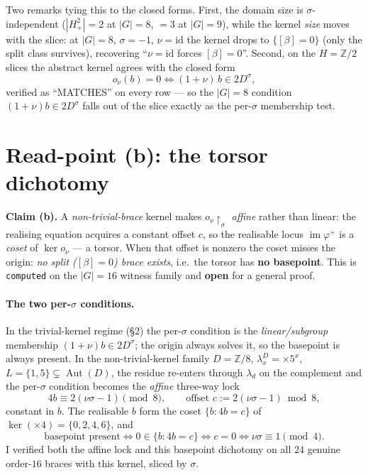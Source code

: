 \documentclass[11pt]{article}
\newcommand{\Aut}{\operatorname{Aut}}
\newcommand{\im}{\operatorname{im}}
\newcommand{\id}{\mathrm{id}}
\newcommand{\Z}{\mathbb{Z}}
\begin{document}
\noindent Two remarks tying this to the closed forms. First, the domain size is
$\sigma$-independent ($|H^2_+|=2$ at $|G|=8$, $=3$ at $|G|=9$), while the kernel
\emph{size} moves with the slice: at $|G|=8$, $\sigma=-1$, $\nu=\id$ the kernel
drops to $\{[\beta]=0\}$ (only the split class survives), recovering ``$\nu=\id$
forces $[\beta]=0$''. Second, on the $H=\Z/2$ slices the abstract kernel agrees
with the closed form
\[
  o_\nu(b)=0\iff (1+\nu)\,b\in 2D^{\sigma},
\]
verified as ``MATCHES'' on every row --- so the $|G|=8$ condition
$(1+\nu)b\in 2D^\sigma$ falls out of the slice exactly as the per-$\sigma$
membership test.

\section{Read-point (b): the torsor dichotomy}

\textbf{Claim (b).} A \emph{non-trivial-brace} kernel makes $o_\nu\restriction_\sigma$
\emph{affine} rather than linear: the realising equation acquires a constant offset
$c$, so the realisable locus $\im\varphi^+$ is a \emph{coset} of $\ker o_\nu$ --- a
torsor. When that offset is nonzero the coset misses the origin: \emph{no split
($[\beta]=0$) brace exists}, i.e.\ the torsor has \textbf{no basepoint}. This is
\texttt{computed} on the $|G|=16$ witness family and \textbf{open} for a general
proof.

\paragraph{The two per-$\sigma$ conditions.} In the trivial-kernel regime
(\S2) the per-$\sigma$ condition is the \emph{linear/subgroup} membership
$(1+\nu)b\in 2D^\sigma$; the origin always solves it, so the basepoint is always
present. In the non-trivial-kernel family $D=\Z/8$, $\lambda^D_x={\times}5^x$,
$L=\{1,5\}\subsetneq\Aut(D)$, the residue re-enters through $\lambda_d$ on the
complement and the per-$\sigma$ condition becomes the \emph{affine} three-way lock
\[
  4b\equiv 2(\nu\sigma-1)\pmod 8,\qquad\text{offset } c:=2(\nu\sigma-1)\bmod 8,
\]
constant in $b$. The realisable $b$ form the coset $\{b:4b=c\}$ of
$\ker({\times}4)=\{0,2,4,6\}$, and
\[
  \text{basepoint present}\iff 0\in\{b:4b=c\}\iff c=0\iff \nu\sigma\equiv 1\pmod 4 .
\]
I verified both the affine lock and this basepoint dichotomy on all $24$ genuine
order-$16$ braces with this kernel, sliced by $\sigma$.
\end{document}
